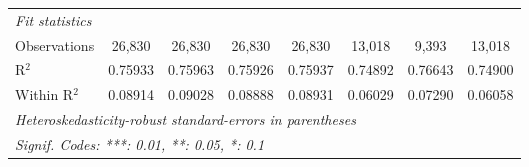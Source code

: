 \begin{table}[htbp]
\begin{tabular}{lccccccc}
      \midrule
      \emph{Fit statistics}\\
      Observations                               & 26,830         & 26,830         & 26,830         & 26,830         & 13,018         & 9,393          & 13,018\\  
      R$^2$                                      & 0.75933        & 0.75963        & 0.75926        & 0.75937        & 0.74892        & 0.76643        & 0.74900\\  
      Within R$^2$                               & 0.08914        & 0.09028        & 0.08888        & 0.08931        & 0.06029        & 0.07290        & 0.06058\\  
      \midrule \midrule
      \multicolumn{8}{l}{\emph{Heteroskedasticity-robust standard-errors in parentheses}}\\
      \multicolumn{8}{l}{\emph{Signif. Codes: ***: 0.01, **: 0.05, *: 0.1}}\\
   \end{tabular}
\end{table}


